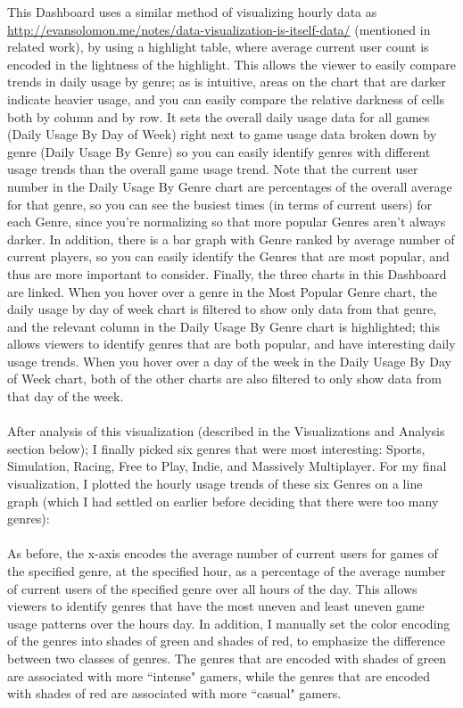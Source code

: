 \documentclass[pdftex,12pt,a4paper]{article}
\begin{document}
This Dashboard uses a similar method of visualizing hourly data as \url{http://evansolomon.me/notes/data-visualization-is-itself-data/} (mentioned in related work), by using a highlight table, where average current user count is encoded in the lightness of the highlight. This allows the viewer to easily compare trends in daily usage by genre; as is intuitive, areas on the chart that are darker indicate heavier usage, and you can easily compare the relative darkness of cells both by column and by row. It sets the overall daily usage data for all games (Daily Usage By Day of Week) right next to game usage data broken down by genre (Daily Usage By Genre) so you can easily identify genres with different usage trends than the overall game usage trend. Note that the current user number in the Daily Usage By Genre chart are percentages of the overall average for that genre, so you can see the busiest times (in terms of current users) for each Genre, since you're normalizing so that more popular Genres aren't always darker. In addition, there is a bar graph with Genre ranked by average number of current players, so you can easily identify the Genres that are most popular, and thus are more important to consider. Finally, the three charts in this Dashboard are linked. When you hover over a genre in the Most Popular Genre chart, the daily usage by day of week chart is filtered to show only data from that genre, and the relevant column in the Daily Usage By Genre chart is highlighted; this allows viewers to identify genres that are both popular, and have interesting daily usage trends. When you hover over a day of the week in the Daily Usage By Day of Week chart, both of the other charts are also filtered to only show data from that day of the week. \\ \\
After analysis of this visualization (described in the Visualizations and Analysis section below); I finally picked six genres that were most interesting: Sports, Simulation, Racing, Free to Play, Indie, and Massively Multiplayer. For my final visualization, I plotted the hourly usage trends of these six Genres on a line graph (which I had settled on earlier before deciding that there were too many genres): \\ \\

As before, the x-axis encodes the average number of current users for games of the specified genre, at the specified hour, as a percentage of the average number of current users of the specified genre over all hours of the day. This allows viewers to identify genres that have the most uneven and least uneven game usage patterns over the hours day. In addition, I manually set the color encoding of the genres into shades of green and shades of red, to emphasize the difference between two classes of genres. The genres that are encoded with shades of green are associated with more ``intense" gamers, while the genres that are encoded with shades of red are associated with more ``casual" gamers. 
\end{document}

